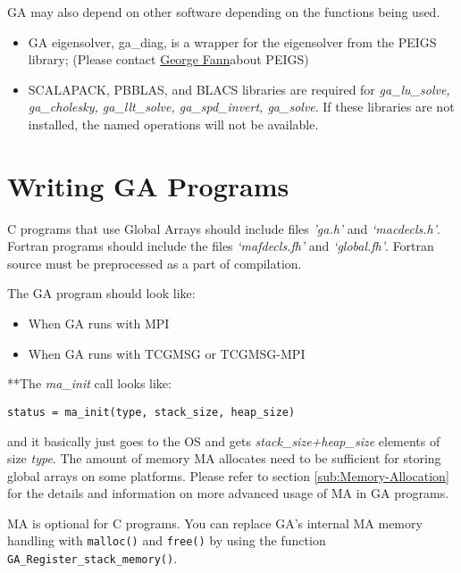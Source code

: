GA may also depend on other software depending on the functions being
used.

\begin{itemize}

\item GA eigensolver, ga\_diag, is a wrapper for the eigensolver from the
PEIGS library; (Please contact \href{mailto:fanngi@ornl.gov}{George Fann}about
PEIGS) 

\item SCALAPACK, PBBLAS, and BLACS libraries are required for \emph{ga\_lu\_solve,
ga\_cholesky, ga\_llt\_solve, ga\_spd\_invert, ga\_solve}. If these
libraries are not installed, the named operations will not be available. 

\end{itemize}

\section{Writing GA Programs}

C programs that use Global Arrays should include files \emph{'ga.h'} and
\emph{`macdecls.h'}. Fortran programs should include the files
\emph{`mafdecls.fh'} and \emph{`global.fh'}. Fortran source must be
preprocessed as a part of compilation.

The GA program should look like:
\begin{itemize}
\item When GA runs with MPI
\end{itemize}


\begin{itemize}
\item When GA runs with TCGMSG or TCGMSG-MPI
\end{itemize}


{*}{*}The \emph{ma\_init} call looks like:
\begin{verbatim}
status = ma_init(type, stack_size, heap_size)
\end{verbatim}
and it basically just goes to the OS and gets \emph{stack\_size+heap\_size}
elements of size \emph{type}. The amount of memory MA allocates need to be
sufficient for storing global arrays on some platforms. Please refer to section
\ref{sub:Memory-Allocation} for the details and information on more advanced
usage of MA in GA programs. 

MA is optional for C programs. You can replace GA's internal MA memory handling
with \texttt{malloc()} and \texttt{free()} by using the function
\texttt{GA\_Register\_stack\_memory()}.


